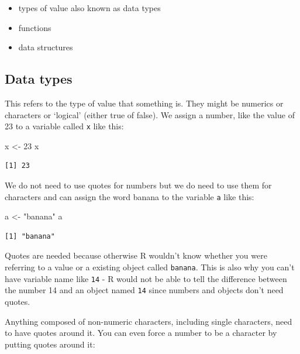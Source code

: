 \documentclass[
  letterpaper,
  DIV=11,
  numbers=noendperiod]{scrreprt}
\newenvironment{Shaded}{\begin{snugshade}}{\end{snugshade}}
\newcommand{\DecValTok}[1]{\textcolor[rgb]{0.68,0.00,0.00}{#1}}
\newcommand{\NormalTok}[1]{\textcolor[rgb]{0.00,0.23,0.31}{#1}}
\newcommand{\OtherTok}[1]{\textcolor[rgb]{0.00,0.23,0.31}{#1}}
\newcommand{\StringTok}[1]{\textcolor[rgb]{0.13,0.47,0.30}{#1}}
\begin{document}
\begin{itemize}
\item
  types of value also known as data types
\item
  functions
\item
  data structures
\end{itemize}

\hypertarget{data-types}{%
\subsection{Data types}\label{data-types}}

This refers to the type of value that something is. They might be
numerics or characters or `logical' (either true of false). We assign a
number, like the value of 23 to a variable called \texttt{x} like this:

\begin{Shaded}
\begin{Highlighting}[]
\NormalTok{x }\OtherTok{\textless{}{-}} \DecValTok{23}
\NormalTok{x}
\end{Highlighting}
\end{Shaded}

\begin{verbatim}
[1] 23
\end{verbatim}

We do not need to use quotes for numbers but we do need to use them for
characters and can assign the word banana to the variable \texttt{a}
like this:

\begin{Shaded}
\begin{Highlighting}[]
\NormalTok{a }\OtherTok{\textless{}{-}} \StringTok{"banana"}
\NormalTok{a}
\end{Highlighting}
\end{Shaded}

\begin{verbatim}
[1] "banana"
\end{verbatim}

Quotes are needed because otherwise R wouldn't know whether you were
referring to a value or a existing object called \texttt{banana}. This
is also why you can't have variable name like \texttt{14} - R would not
be able to tell the difference between the number 14 and an object named
\texttt{14} since numbers and objects don't need quotes.

Anything composed of non-numeric characters, including single
characters, need to have quotes around it. You can even force a number
to be a character by putting quotes around it:
\end{document}
